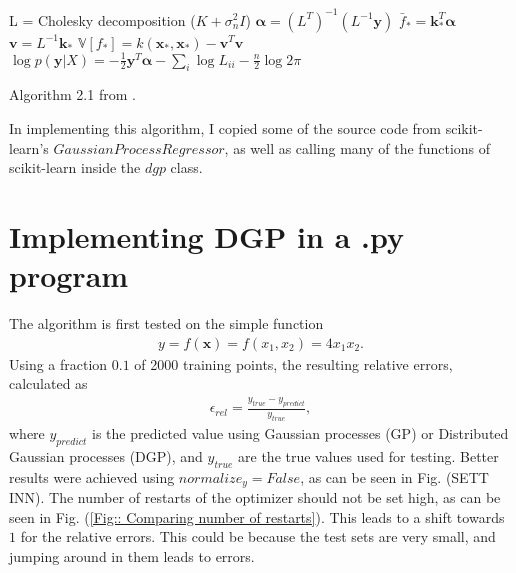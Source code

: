 \documentclass[twoside,english]{uiofysmaster}
\begin{document}
\begin{algorithm}
L = Cholesky decomposition ($K + \sigma_n^2 I$) \;
$\boldsymbol{\alpha} = (L^T)^{-1}(L^{-1} \textbf{y})$ \;
$\bar{f}_* = \textbf{k}_*^T \boldsymbol{\alpha}$ \;
$\textbf{v} = L^{-1} \textbf{k}_*$ \;
$\mathbb{V}[f_*] = k(\textbf{x}_*, \textbf{x}_*) - \textbf{v}^T \textbf{v}$ \;
$\log p(\textbf{y}|X) = - \frac{1}{2} \textbf{y}^T \boldsymbol{\alpha} - \sum_i \log L_{ii} - \frac{n}{2} \log 2 \pi$ \;
\caption{Algorithm 2.1 from \cite{rasmussen2006gaussian}.}
\label{Alg:: GP}
\end{algorithm}

In implementing this algorithm, I copied some of the source code from scikit-learn's $GaussianProcessRegressor$, as well as calling many of the functions of scikit-learn inside the $dgp$ class. 











\pagebreak

\section{Implementing DGP in a .py program}

The algorithm is first tested on the simple function
\begin{align}\label{Eq:: test function f(x)}
y = f(\textbf{x}) = f(x_1, x_2) = 4 x_1 x_2.
\end{align}
Using a fraction $0.1$ of 2000 training points, the resulting relative errors, calculated as
\begin{align}\label{Eq:: rel err}
\epsilon_{rel} = \frac{y_{true} - y_{predict}}{y_{true}},
\end{align}
where $y_{predict}$ is the predicted value using Gaussian processes (GP) or Distributed Gaussian processes (DGP), and $y_{true}$ are the true values used for testing. Better results were achieved using $normalize_y = False$, as can be seen in Fig. (SETT INN). The number of restarts of the optimizer should not be set high, as can be seen in Fig. (\ref{Fig:: Comparing number of restarts}). This leads to a shift towards $1$ for the relative errors. This could be because the test sets are very small, and jumping around in them leads to errors. 
\end{document}
